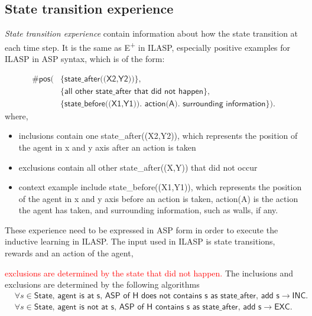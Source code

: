 \subsection{State transition experience}
\textit{State transition experience} contain information about how the state transition at each time step.
 It is the same as E\textsuperscript{+} in ILASP, especially positive examples for ILASP in ASP syntax, which is of the form:

\begin{equation}
\begin{split}
\textsf{\#pos(} & \textsf{\{state\_after((X2,Y2))\}},\\
& \{\textsf{all other state\_after that did not happen}\}, \\
& \{\textsf{state\_before((X1,Y1)). action(A). surrounding information}\}).
\end{split}
\end{equation}
where,
\begin{itemize}
    \item inclusions contain one state\_after((X2,Y2)), which represents the position of the agent in x and y axis after an action is taken 
    \item exclusions contain all other state\_after((X,Y)) that did not occur
    \item context example include state\_before((X1,Y1)), which represents the position of the agent in x and y axis before an action is taken,
    action(A) is the action the agent has taken, and surrounding information, such as walls, if any. 
\end{itemize}

These experience need to be expressed in ASP form in order to execute the inductive learning in ILASP. The input used in ILASP is state transitions, 
rewards and an action of the agent, 

\textcolor{red}{exclusions are determined by the state that did not happen.}
The inclusions and exclusions are determined by the following algorithms
\begin{equation*}
\begin{split}
    &\forall s \in \textsf{State, agent is at s, ASP of H does not contains s as state\_after, add s} \rightarrow \textsf{INC.} \\
    & \forall s \in \textsf{State, agent is not at s, ASP of H contains s as state\_after, add s} \rightarrow \textsf{EXC.} 
\end{split}
\end{equation*}

